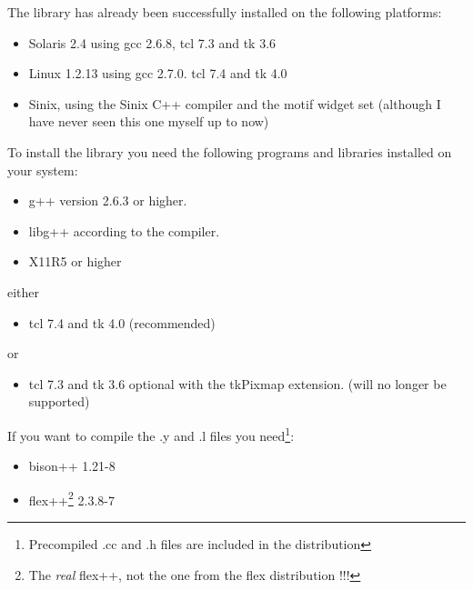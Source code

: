 The library has already been successfully installed on the following
platforms:

\begin{itemize}

\item Solaris 2.4 using gcc 2.6.8, tcl 7.3 and tk 3.6

\item Linux 1.2.13 using gcc 2.7.0. tcl 7.4 and tk 4.0

\item Sinix, using the Sinix C++ compiler and the motif widget set
(although I have never seen this one myself up to now)

\end{itemize}

To install the library you need the following programs and libraries
installed on your system:

\begin{itemize}

\item g++ version 2.6.3 or higher.
\item libg++ according to the compiler.
\item X11R5 or higher

\end{itemize}

either

\begin{itemize}

\item tcl 7.4 and tk 4.0 (recommended)

\end{itemize}

or

\begin{itemize}

\item tcl 7.3 and tk 3.6 optional with the tkPixmap
  extension. (will no longer be supported)

\end{itemize}

If you want to compile the .y and .l files you
need\footnote{Precompiled .cc and .h files are included in the
  distribution}:

\begin{itemize}
\item bison++ 1.21-8 
\item flex++\footnote{The {\it real} flex++, not the one from the
    flex distribution !!!} 2.3.8-7
\end{itemize}

